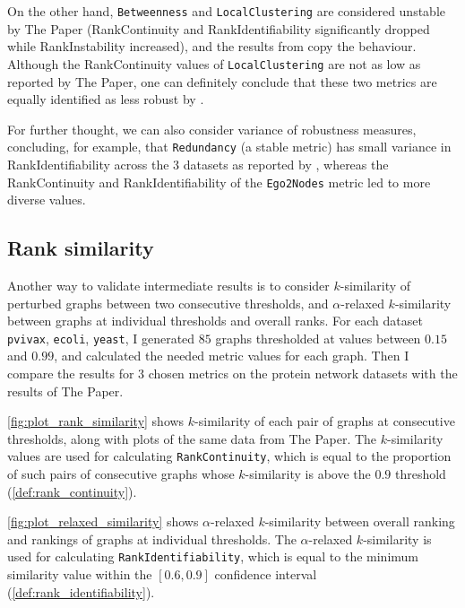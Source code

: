 On the other hand, \texttt{Betweenness} and \texttt{LocalClustering} are considered unstable by The Paper (RankContinuity and RankIdentifiability significantly dropped while RankInstability increased), and the results from \graffs copy the behaviour.
Although the RankContinuity values of \texttt{LocalClustering} are not as low as reported by The Paper, one can definitely conclude that these two metrics are equally identified as less robust by \graffs.

For further thought, we can also consider variance of robustness measures, concluding, for example, that \texttt{Redundancy} (a stable metric) has small variance in RankIdentifiability across the 3 datasets as reported by \graffs, whereas the RankContinuity and RankIdentifiability of the \texttt{Ego2Nodes} metric led to more diverse values.

\subsection{Rank similarity}

Another way to validate intermediate results is to consider $k$-similarity of perturbed graphs between two consecutive thresholds, and $\alpha$-relaxed $k$-similarity between graphs at individual thresholds and overall ranks.
For each dataset \texttt{pvivax}, \texttt{ecoli}, \texttt{yeast}, I generated $85$ graphs thresholded at values between $0.15$ and $0.99$, and calculated the needed metric values for each graph.
Then I compare the results for 3 chosen metrics on the protein network datasets with the results of The Paper.



\autoref{fig:plot_rank_similarity} shows $k$-similarity of each pair of graphs at consecutive thresholds, along with plots of the same data from The Paper.
The $k$-similarity values are used for calculating \texttt{RankContinuity}, which is equal to the proportion of such pairs of consecutive graphs whose $k$-similarity is above the $0.9$ threshold (\autoref{def:rank_continuity}).

\autoref{fig:plot_relaxed_similarity} shows $\alpha$-relaxed $k$-similarity between overall ranking and rankings of graphs at individual thresholds.
The $\alpha$-relaxed $k$-similarity is used for calculating \texttt{RankIdentifiability}, which is equal to the minimum similarity value within the $\left[ 0.6, 0.9 \right]$ confidence interval (\autoref{def:rank_identifiability}).

